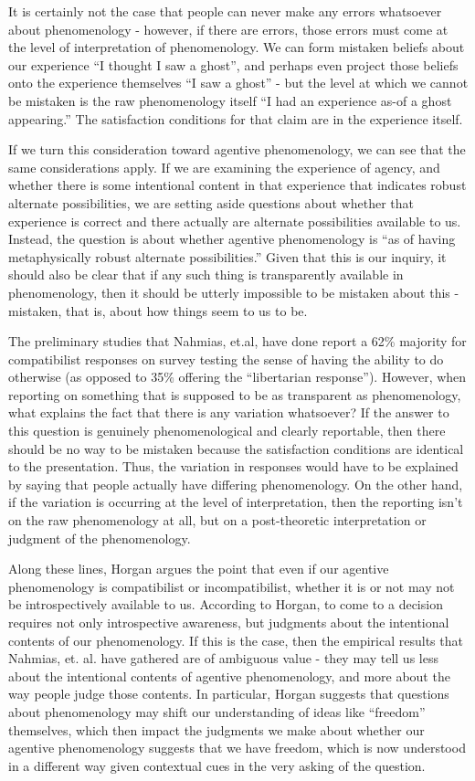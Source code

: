 \documentclass[phd,12pt,oneside,paper=letterpaper]{ubcthesis}
\begin{document}
It is certainly not the case that people can never make any errors whatsoever about phenomenology - however, if there are errors, those errors must come at the level of interpretation of phenomenology. We can form mistaken beliefs about our experience ``I thought I saw a ghost'', and perhaps even project those beliefs onto the experience themselves ``I saw a ghost'' - but the level at which we cannot be mistaken is the raw phenomenology itself ``I had an experience as-of a ghost appearing.'' The satisfaction conditions for that claim are in the experience itself.  

If we turn this consideration toward agentive phenomenology, we can see that the same considerations apply. If we are examining the experience of agency, and whether there is some intentional content in that experience that indicates robust alternate possibilities, we are setting aside questions about whether that experience is correct and there actually are alternate possibilities available to us. Instead, the question is about whether agentive phenomenology is ``as of having metaphysically robust alternate possibilities.'' Given that this is our inquiry, it should also be clear that if any such thing is transparently available in phenomenology, then it should be utterly impossible to be mistaken about this - mistaken, that is, about how things seem to us to be. 

The preliminary studies that Nahmias, et.al, have done report a 62\% majority for compatibilist responses on survey testing the sense of having the ability to do otherwise (as opposed to 35\% offering the ``libertarian response''). However, when reporting on something that is supposed to be as transparent as phenomenology, what explains the fact that there is any variation whatsoever? If the answer to this question is genuinely phenomenological and clearly reportable, then there should be no way to be mistaken because the satisfaction conditions are   identical to the presentation. Thus, the variation in responses would have to be explained by saying that people actually have differing phenomenology. On the other hand, if the variation is occurring at the level of interpretation, then the reporting isn't on the raw phenomenology at all, but on a post-theoretic interpretation or judgment of the phenomenology.

Along these lines, Horgan \citeyearpar{horgan2007} argues the point that even if our agentive phenomenology is compatibilist or incompatibilist, whether it is or not may not be introspectively available to us. According to Horgan, to come to a decision requires not only introspective awareness, but judgments about the intentional contents of our phenomenology. If this is the case, then the empirical results that Nahmias, et. al. have gathered are of ambiguous value - they may tell us less about the intentional contents of agentive phenomenology, and more about the way people judge those contents. In particular, Horgan suggests that questions about phenomenology may shift our understanding of ideas like ``freedom'' themselves, which then impact the judgments we make about whether our agentive phenomenology suggests that we have freedom, which is now understood in a different way given contextual cues in the very asking of the question. 
\end{document}
